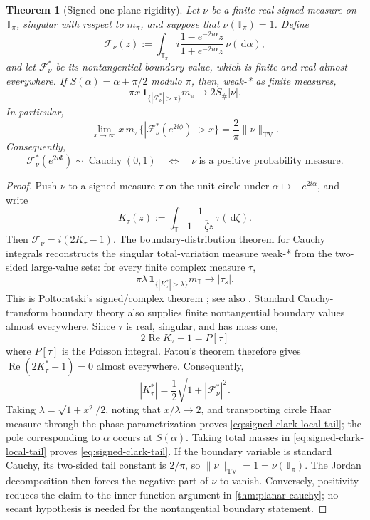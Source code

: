\documentclass[11pt]{article}
\numberwithin{equation}{section}
\theoremstyle{thmstyleone}%
\newtheorem{theorem}{Theorem}[section]
\theoremstyle{thmstyletwo}%
\let\cref\autoref
\newcommand{\dd}{\,\mathrm d}
\newcommand{\Cauchy}{\operatorname{Cauchy}}
\begin{document}
\begin{theorem}[Signed one-plane rigidity]
\label{thm:signed-clark-rigidity}
Let \(\nu\) be a finite real signed measure on \(\mathbb T_\pi\), singular
with respect to \(m_\pi\), and suppose that \(\nu(\mathbb T_\pi)=1\).
Define
\[
  \mathcal F_\nu(z)
  :=
  \int_{\mathbb T_\pi}
  i\frac{1-e^{-2i\alpha}z}{1+e^{-2i\alpha}z}
  \,\nu(\dd\alpha),
\]
and let \(\mathcal F_\nu^*\) be its nontangential boundary value, which is
finite and real almost everywhere.  If
\(S(\alpha)=\alpha+\pi/2\) modulo \(\pi\), then, weak-* as finite measures,
\begin{equation}
  \pi x\,\boldsymbol 1_{\{|\mathcal F_\nu^*|>x\}}m_\pi
  \longrightarrow 2S_\#|\nu|.
  \label{eq:signed-clark-local-tail}
\end{equation}
In particular,
\begin{equation}
  \lim_{x\to\infty}
  x\,m_\pi\{|\mathcal F_\nu^*(e^{2i\phi})|>x\}
  =
  \frac2\pi\|\nu\|_{\mathrm{TV}}.
  \label{eq:signed-clark-tail}
\end{equation}
Consequently,
\[
  \mathcal F_\nu^*(e^{2i\Phi})\sim\Cauchy(0,1)
  \quad\Longleftrightarrow\quad
  \nu\ \text{is a positive probability measure}.
\]
\end{theorem}

\begin{proof}
Push \(\nu\) to a signed measure \(\tau\) on the unit circle under
\(\alpha\mapsto-e^{2i\alpha}\), and write
\[
  K_\tau(z):=\int_{\mathbb T}\frac{1}{1-\overline\zeta z}
  \,\tau(\dd\zeta).
\]
Then \(\mathcal F_\nu=i(2K_\tau-1)\).  The boundary-distribution theorem for
Cauchy integrals reconstructs the singular total-variation measure weak-*
from the two-sided large-value sets: for every finite complex measure
\(\tau\),
\[
  \pi\lambda\,\boldsymbol 1_{\{|K_\tau^*|>\lambda\}}m_{\mathbb T}
  \longrightarrow |\tau_s|.
\]
This is Poltoratski's signed/complex theorem \cite{poltoratski-1996}; see
also \cite[Theorem~8.3]{cima-matheson-ross-2006}.  Standard Cauchy-transform
boundary theory also supplies finite nontangential boundary values almost
everywhere.  Since \(\tau\) is real, singular, and has mass one,
\[
  2\operatorname{Re}K_\tau-1=P[\tau]
\]
where \(P[\tau]\) is the Poisson integral.  Fatou's theorem therefore gives
\(\operatorname{Re}(2K_\tau^*-1)=0\) almost everywhere.  Consequently,
\[
  |K_\tau^*|=\frac12\sqrt{1+|\mathcal F_\nu^*|^2}.
\]
Taking \(\lambda=\sqrt{1+x^2}/2\), noting that \(x/\lambda\to2\), and
transporting circle Haar measure through the phase parametrization proves
\cref{eq:signed-clark-local-tail}; the pole corresponding to \(\alpha\)
occurs at \(S(\alpha)\).
Taking total masses in \cref{eq:signed-clark-local-tail} proves
\cref{eq:signed-clark-tail}.  If the boundary variable is
standard Cauchy, its two-sided tail constant is \(2/\pi\), so
\(\|\nu\|_{\mathrm{TV}}=1=\nu(\mathbb T_\pi)\).  The Jordan decomposition
then forces the negative part of \(\nu\) to vanish.  Conversely, positivity
reduces the claim to the inner-function argument in
\cref{thm:planar-cauchy}; no secant hypothesis is needed for the
nontangential boundary statement.
\end{proof}
\end{document}
